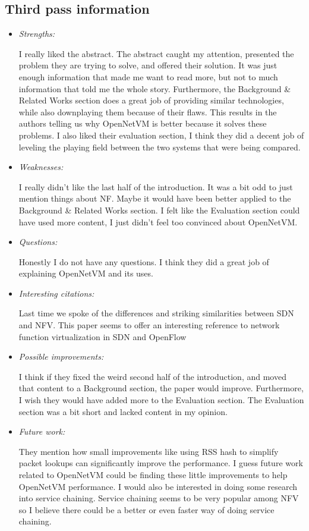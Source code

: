 \documentclass[letterpaper,twocolumn,10pt]{article}
\begin{document}
\subsection{Third pass information}
\label{sec:third}
\begin{itemize}

\item {\it Strengths:} 

I really liked the abstract. The abstract caught my attention, presented the problem they are trying to solve, and 
offered their solution. It was just enough information that made me want to read more, but not to much information 
that told me the whole story. Furthermore, the Background \& Related Works section does a great job of providing 
similar technologies, while also downplaying them because of their flaws. This results in the authors telling us why
OpenNetVM is better because it solves these problems. I also liked their evaluation section, I think they did 
a decent job of leveling the playing field between the two systems that were being compared. 

\item {\it Weaknesses:} 

I really didn't like the last half of the introduction. It was a bit odd to just mention things about NF. Maybe it would 
have been better applied to the Background \& Related Works section. I felt like the Evaluation section could have used more
content, I just didn't feel too convinced about OpenNetVM.

\item {\it Questions:} 

Honestly I do not have any questions. I think they did a great job of explaining OpenNetVM and its uses. 

\item {\it Interesting citations:}

Last time we spoke of the differences and striking similarities between SDN and NFV. This paper seems to
offer an interesting reference to network function virtualization in SDN and OpenFlow ~\cite{nfvsdn}

\item {\it Possible improvements:} 

I think if they fixed the weird second half of the introduction, and moved that content to a Background
section, the paper would improve. Furthermore, I wish they would have added more to the Evaluation section.
The Evaluation section was a bit short and lacked content in my opinion. 

\item {\it Future work:} 

They mention how small improvements like using RSS hash to simplify packet lookups can significantly
improve the performance. I guess future work related to OpenNetVM could be finding these little
improvements to help OpenNetVM performance. I would also be interested in doing some research
into service chaining. Service chaining seems to be very popular among NFV so I believe there could
be a better or even faster way of doing service chaining. 

\end{itemize}

{
  \small 
  
  
}
\end{document}
